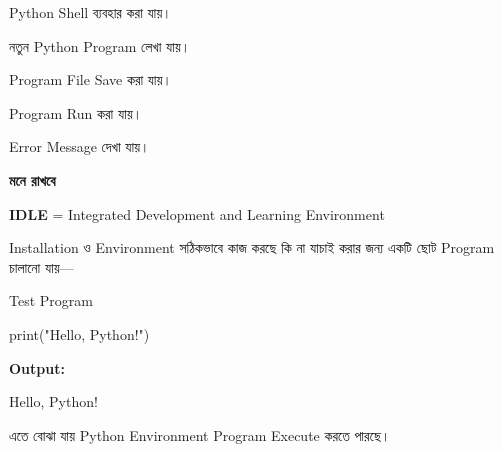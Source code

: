 \begin{compacttwocolpoints}

\item Python Shell ব্যবহার করা যায়।

\item নতুন Python Program লেখা যায়।

\item Program File Save করা যায়।

\item Program Run করা যায়।

\item Error Message দেখা যায়।

\end{compacttwocolpoints}

\begin{rememberbox}

\textbf{\color{deepOrange}মনে রাখবে}

\textbf{IDLE}
=
Integrated Development and Learning Environment

\end{rememberbox}



Installation ও Environment সঠিকভাবে কাজ করছে কি না
যাচাই করার জন্য একটি ছোট Program চালানো যায়—

\begin{examplebox}{Test Program}

\begin{codebox}

\begin{english}
\ttfamily
print("Hello, Python!")
\end{english}

\end{codebox}

\textbf{Output:}

\begin{codebox}

\begin{english}
\ttfamily
Hello, Python!
\end{english}

\end{codebox}

এতে বোঝা যায় Python Environment Program Execute করতে পারছে।

\end{examplebox}

